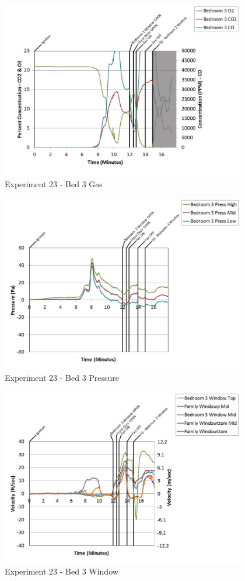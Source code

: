 \documentclass{article}
\begin{document}
\begin{appendices}
	\clearpage

	\begin{figure}[h!]
		\centering
		\includegraphics[height=3.05in]{0_Images/Results_Charts/Exp_23_Charts/Bed3Gas.pdf}
		\caption{Experiment 23 - Bed 3 Gas}
	\end{figure}
 

	\begin{figure}[h!]
		\centering
		\includegraphics[height=3.05in]{0_Images/Results_Charts/Exp_23_Charts/Bed3Pressure.pdf}
		\caption{Experiment 23 - Bed 3 Pressure}
	\end{figure}
 
	\clearpage

	\begin{figure}[h!]
		\centering
		\includegraphics[height=3.05in]{0_Images/Results_Charts/Exp_23_Charts/Bed3Window.pdf}
		\caption{Experiment 23 - Bed 3 Window}
	\end{figure}
 


\end{appendices}
\end{document}
